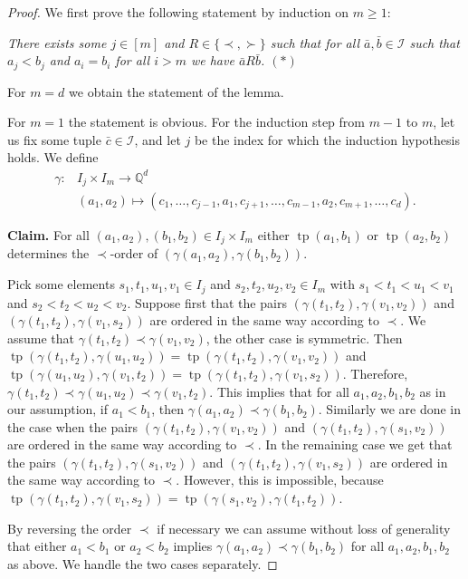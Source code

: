 \documentclass{amsart}
\theoremstyle{definition}
\theoremstyle{remark}
\numberwithin{equation}{section}
\newcommand{\tp}{\operatorname{tp}}
\newcommand\qup[1]{\mathbb{Q}_\nearrow^{#1}}
\begin{document}
\begin{proof}
	We first prove the following statement by induction on $m \geq 1$:
	
	\emph{There exists some $j\in [m]$ and $R\in \{\prec,\succ\}$ such that for all $\bar{a},\bar{b}\in {\mathcal{I}}$ such that $a_j<b_j$ and $a_i=b_i$ for all $i>m$ we have $\bar{a}R\bar{b}$. $(\ast)$}
	
	For $m=d$ we obtain the statement of the lemma.
	
	For $m=1$ the statement is obvious. For the induction step from $m-1$ to $m$, let us fix some tuple $\bar{c}\in {\mathcal{I}}$, and let $j$ be the index for which the induction hypothesis holds. We define
\begin{align*}
\gamma\colon&I_j\times I_m\rightarrow \mathbb{Q}^d\\
&(a_1,a_2)\mapsto(c_1,\dots,c_{j-1},a_1,c_{j+1},\dots,c_{m-1},a_2,c_{m+1},\dots,c_d).%
\end{align*}
	
	{\bf Claim.} For all $(a_1,a_2),(b_1,b_2)\in I_j\times I_m$ either $\tp(a_1,b_1)$ or $\tp(a_2,b_2)$ determines the $\prec$-order of $(\gamma(a_1,a_2),\gamma(b_1,b_2))$.
	
	Pick some elements $s_1,t_1,u_1,v_1\in I_j$ and $s_2,t_2,u_2,v_2\in I_m$ with $s_1<t_1<u_1<v_1$ and $s_2<t_2<u_2<v_2$. Suppose first that the pairs $(\gamma(t_1,t_2),\gamma(v_1,v_2))$ and $(\gamma(t_1,t_2),\gamma(v_1,s_2))$ are ordered in the same way according to $\prec$. We assume that $\gamma(t_1,t_2)\prec\gamma(v_1,v_2)$, the other case is symmetric. Then $\tp(\gamma(t_1,t_2),\gamma(u_1,u_2))=\tp(\gamma(t_1,t_2),\gamma(v_1,v_2))$ and $\tp(\gamma(u_1,u_2),\gamma(v_1,t_2))=\tp(\gamma(t_1,t_2),\gamma(v_1,s_2))$. Therefore, $\gamma(t_1,t_2)\prec \gamma(u_1,u_2)\prec \gamma(v_1,t_2)$. This implies that for all $a_1,a_2,b_1,b_2$ as in our assumption, if $a_1<b_1$, then $\gamma(a_1,a_2)\prec \gamma(b_1,b_2)$. Similarly we are done in the case when the pairs $(\gamma(t_1,t_2),\gamma(v_1,v_2))$ and $(\gamma(t_1,t_2),\gamma(s_1,v_2))$ are ordered in the same way according to $\prec$. In the remaining case we get that the pairs $(\gamma(t_1,t_2),\gamma(s_1,v_2))$ and $(\gamma(t_1,t_2),\gamma(v_1,s_2))$ are ordered in the same way according to $\prec$. However, this is  impossible, because $\tp(\gamma(t_1,t_2),\gamma(v_1,s_2))=\tp(\gamma(s_1,v_2),\gamma(t_1,t_2))$.

	By reversing the order $\prec$ if necessary we can assume without loss of generality that either $a_1<b_1$ or $a_2<b_2$ implies $\gamma(a_1,a_2)\prec \gamma(b_1,b_2)$ for all $a_1,a_2,b_1,b_2$ as above. We handle the two cases separately.
	

\end{proof}
\end{document}
